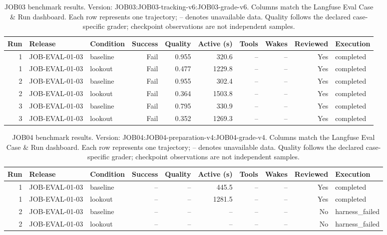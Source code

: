 \begin{table}[t]
\centering\scriptsize
\begin{tabular}{@{}rllrrrrrrl@{}}
\toprule
Run & Release & Condition & Success & Quality & Active (s) & Tools & Wakes & Reviewed & Execution \\
\midrule
1 & JOB-EVAL-01-03 & baseline & Fail & 0.955 & 320.6 & -- & -- & Yes & completed \\
1 & JOB-EVAL-01-03 & lookout & Fail & 0.477 & 1229.8 & -- & -- & Yes & completed \\
2 & JOB-EVAL-01-03 & baseline & Fail & 0.955 & 302.4 & -- & -- & Yes & completed \\
2 & JOB-EVAL-01-03 & lookout & Fail & 0.364 & 1503.8 & -- & -- & Yes & completed \\
3 & JOB-EVAL-01-03 & baseline & Fail & 0.795 & 330.9 & -- & -- & Yes & completed \\
3 & JOB-EVAL-01-03 & lookout & Fail & 0.352 & 1269.3 & -- & -- & Yes & completed \\
\bottomrule
\end{tabular}
\caption{JOB03 benchmark results. Version: JOB03:JOB03-tracking-v6:JOB03-grade-v6. Columns match the Langfuse Eval Case \& Run dashboard. Each row represents one trajectory; -- denotes unavailable data. Quality follows the declared case-specific grader; checkpoint observations are not independent samples.}
\label{tab:job-results-1}
\end{table}

\begin{table}[t]
\centering\scriptsize
\begin{tabular}{@{}rllrrrrrrl@{}}
\toprule
Run & Release & Condition & Success & Quality & Active (s) & Tools & Wakes & Reviewed & Execution \\
\midrule
1 & JOB-EVAL-01-03 & baseline & -- & -- & 445.5 & -- & -- & Yes & completed \\
1 & JOB-EVAL-01-03 & lookout & -- & -- & 1281.5 & -- & -- & Yes & completed \\
2 & JOB-EVAL-01-03 & baseline & -- & -- & -- & -- & -- & No & harness\_failed \\
2 & JOB-EVAL-01-03 & lookout & -- & -- & -- & -- & -- & No & harness\_failed \\
\bottomrule
\end{tabular}
\caption{JOB04 benchmark results. Version: JOB04:JOB04-preparation-v4:JOB04-grade-v4. Columns match the Langfuse Eval Case \& Run dashboard. Each row represents one trajectory; -- denotes unavailable data. Quality follows the declared case-specific grader; checkpoint observations are not independent samples.}
\label{tab:job-results-2}
\end{table}
